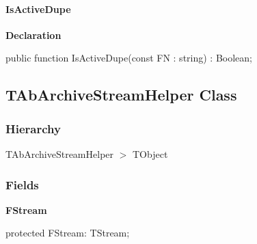 \documentclass{report}
\newif\ifpdf
\begin{document}
\paragraph*{IsActiveDupe}\hspace*{\fill}

\label{AbArcTyp.TAbArchiveList-IsActiveDupe}
\begin{list}{}{
\setlength{\itemindent}{0cm}
\setlength{\listparindent}{0cm}
\setlength{\leftmargin}{\evensidemargin}
\addtolength{\leftmargin}{\tmplength}
\settowidth{\labelsep}{X}
\addtolength{\leftmargin}{\labelsep}
\setlength{\labelwidth}{\tmplength}
}
\item[\textbf{Declaration}\hfill]
\ifpdf
\begin{flushleft}
\fi
\begin{ttfamily}
public function IsActiveDupe(const FN : string) : Boolean;\end{ttfamily}

\ifpdf
\end{flushleft}
\fi

\end{list}
\ifpdf
\subsection*{\large{\textbf{TAbArchiveStreamHelper Class}}\normalsize\hspace{1ex}\hrulefill}
\else
\subsection*{TAbArchiveStreamHelper Class}
\fi
\label{AbArcTyp.TAbArchiveStreamHelper}
\subsubsection*{\large{\textbf{Hierarchy}}\normalsize\hspace{1ex}\hfill}
TAbArchiveStreamHelper {$>$} TObject
\subsubsection*{\large{\textbf{Fields}}\normalsize\hspace{1ex}\hfill}
\begin{list}{}{
\setlength{\itemindent}{0cm}
\setlength{\listparindent}{0cm}
\setlength{\leftmargin}{\evensidemargin}
\addtolength{\leftmargin}{\tmplength}
\settowidth{\labelsep}{X}
\addtolength{\leftmargin}{\labelsep}
\setlength{\labelwidth}{\tmplength}
}
\label{AbArcTyp.TAbArchiveStreamHelper-FStream}
\item[\textbf{FStream}\hfill]
\ifpdf
\begin{flushleft}
\fi
\begin{ttfamily}
protected FStream: TStream;\end{ttfamily}

\ifpdf
\end{flushleft}
\fi


\par  \end{list}
\end{document}
